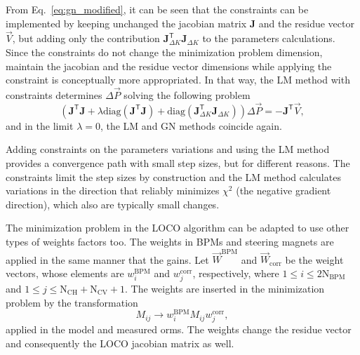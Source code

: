 From Eq.~\eqref{eq:gn_modified}, it can be seen that the constraints can be implemented by keeping unchanged the jacobian matrix $\mathbf{J}$ and the residue vector $\vec{V}$, but adding only the contribution $\mathbf{J}^{\mathsf{T}}_{\Delta K}\mathbf{J}_{\Delta K}$ to the parameters calculations. Since the constraints do not change the minimization problem dimension, maintain the jacobian and the residue vector dimensions while applying the constraint is conceptually more appropriated. In that way, the LM method with constraints determines $\Delta \vec{P}$ solving the following problem
\begin{equation}
\left(\mathbf{J}^{\mathsf{T}}\mathbf{J} + \lambda \mathrm{diag}\left(\mathbf{J}^{\mathsf{T}}\mathbf{J}\right) + \mathrm{diag}\left(\mathbf{J}^{\mathsf{T}}_{\Delta K}\mathbf{J}_{\Delta K}\right) \right)\Delta \vec{P} = - \mathbf{J}^{\mathsf{T}}\vec{V},
\end{equation}
and in the limit $\lambda = 0$, the LM and GN methods coincide again.

Adding constraints on the parameters variations and using the LM method provides a convergence path with small step sizes, but for different reasons. The constraints limit the step sizes by construction and the LM method calculates variations in the direction that reliably minimizes $\chi^2$ (the negative gradient direction), which also are typically small changes.

The minimization problem in the LOCO algorithm can be adapted to use other types of weights factors too. The weights in BPMs and steering magnets are applied in the same manner that the gains. Let $\vec{W}^{\mathrm{BPM}}$ and $\vec{W}_{\mathrm{corr}}$ be the weight vectors, whose elements are $w^{\mathrm{BPM}}_{i}$ and $w^{\mathrm{corr}}_{j}$, respectively, where $1 \leq i \leq 2\mathrm{N}_{\mathrm{BPM}}$ and $1 \leq j \leq \mathrm{N}_{\mathrm{CH}} + \mathrm{N}_{\mathrm{CV}} + 1$. The weights are inserted in the minimization problem by the transformation
\begin{equation}
    M_{ij} \rightarrow w^{\mathrm{BPM}}_{i}M_{ij}w^{\mathrm{corr}}_{j}, 
\end{equation}
applied in the model and measured \gls{orm}s. The weights change the residue vector and consequently the LOCO jacobian matrix as well. 



